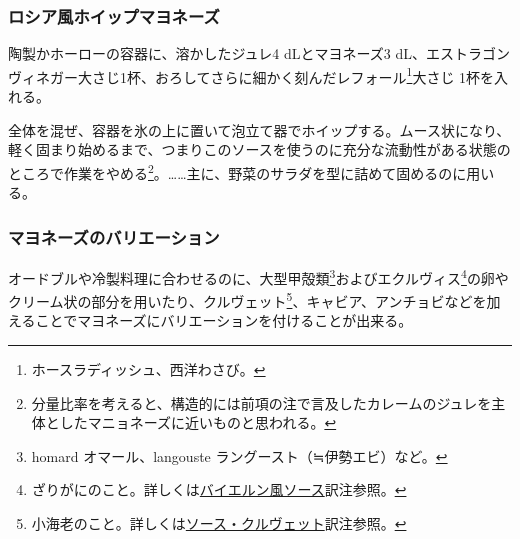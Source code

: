 \begin{recette}
\atoaki{}

\hypertarget{mayonnaise-fouette-russe}{%
\subsubsection{ロシア風ホイップマヨネーズ}\label{mayonnaise-fouette-russe}}



陶製かホーローの容器に、溶かしたジュレ4 dLとマヨネーズ3
dL、エストラゴンヴィネガー大さじ1杯、おろしてさらに細かく刻んだレフォール\footnote{ホースラディッシュ、西洋わさび。}大さじ
1杯を入れる。

全体を混ぜ、容器を氷の上に置いて泡立て器でホイップする。ムース状になり、軽く固まり始めるまで、つまりこのソースを使うのに充分な流動性がある状態のところで作業をやめる\footnote{分量比率を考えると、構造的には前項の注で言及したカレームのジュレを主体としたマニョネーズに近いものと思われる。}。\ldots{}\ldots{}主に、野菜のサラダを型に詰めて固めるのに用いる。

\atoaki{}

\hypertarget{mayonnaises-divierses}{%
\subsubsection{マヨネーズのバリエーション}\label{mayonnaises-divierses}}



オードブルや冷製料理に合わせるのに、大型甲殻類\footnote{homard
  オマール、langouste ラングースト（≒伊勢エビ）など。}およびエクルヴィス\footnote{ざりがにのこと。詳しくは\protect\hyperlink{sauce-bavaroise}{バイエルン風ソース}訳注参照。}の卵やクリーム状の部分を用いたり、クルヴェット\footnote{小海老のこと。詳しくは\protect\hyperlink{sauce-aux-crevettes}{ソース・クルヴェット}訳注参照。}、キャビア、アンチョビなどを加えることでマヨネーズにバリエーションを付けることが出来る。


\end{recette}

